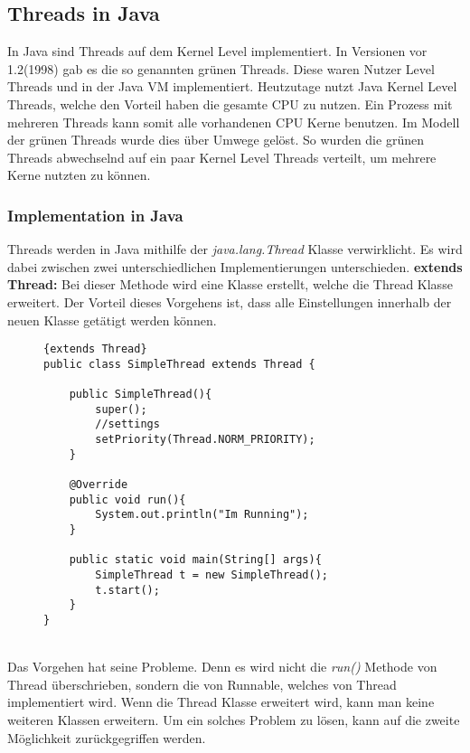 \subsection{Threads in Java}\label{ThreadsInJava}
In Java sind Threads auf dem Kernel Level implementiert. In Versionen vor 1.2(1998) gab es die so genannten grünen Threads. Diese waren Nutzer Level Threads und in der Java VM implementiert. Heutzutage nutzt Java Kernel Level Threads, welche den Vorteil haben die gesamte CPU zu nutzen. Ein Prozess mit mehreren Threads kann somit alle vorhandenen CPU Kerne benutzen. Im Modell der grünen Threads wurde dies über Umwege gelöst. So wurden die grünen Threads abwechselnd auf ein paar Kernel Level Threads verteilt, um mehrere Kerne nutzten zu können.\cite{Threads:Cox}
\subsubsection{Implementation in Java}
Threads werden in Java mithilfe der \textit{java.lang.Thread} Klasse verwirklicht. Es wird dabei zwischen zwei unterschiedlichen Implementierungen unterschieden.
\smallskip
\newline
\textbf{extends Thread:} Bei dieser Methode wird eine Klasse erstellt, welche die Thread Klasse erweitert. Der Vorteil dieses Vorgehens ist, dass alle Einstellungen innerhalb der neuen Klasse getätigt werden können.\cite{Java:Thread}
\begin{figure}[h]
\begin{lstlisting}{extends Thread}
public class SimpleThread extends Thread {

    public SimpleThread(){
        super();
        //settings
        setPriority(Thread.NORM_PRIORITY);
    }

    @Override
    public void run(){
        System.out.println("Im Running");
    }

    public static void main(String[] args){
        SimpleThread t = new SimpleThread();
        t.start();
    }
}
\end{lstlisting}
\end{figure}
\\Das Vorgehen hat seine Probleme. Denn es wird nicht die \textit{run()} Methode von Thread überschrieben, sondern die von Runnable, welches von Thread implementiert wird. Wenn die Thread Klasse erweitert wird, kann man keine weiteren Klassen erweitern. Um ein solches Problem zu lösen, kann auf die zweite Möglichkeit zurückgegriffen werden.

